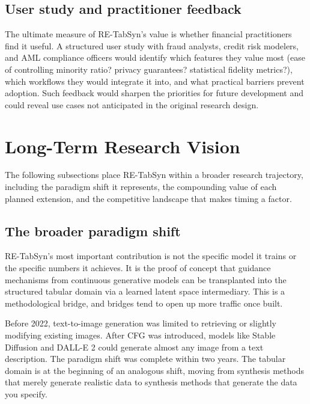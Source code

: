 \subsection{User study and practitioner feedback}

The ultimate measure of RE-TabSyn's value is whether financial practitioners find it useful. A structured user study with fraud analysts, credit risk modelers, and AML compliance officers would identify which features they value most (ease of controlling minority ratio? privacy guarantees? statistical fidelity metrics?), which workflows they would integrate it into, and what practical barriers prevent adoption. Such feedback would sharpen the priorities for future development and could reveal use cases not anticipated in the original research design.

\section{Long-Term Research Vision}

The following subsections place RE-TabSyn within a broader research trajectory, including the paradigm shift it represents, the compounding value of each planned extension, and the competitive landscape that makes timing a factor.

\subsection{The broader paradigm shift}

RE-TabSyn's most important contribution is not the specific model it trains or the specific numbers it achieves. It is the proof of concept that guidance mechanisms from continuous generative models can be transplanted into the structured tabular domain via a learned latent space intermediary. This is a methodological bridge, and bridges tend to open up more traffic once built.

Before 2022, text-to-image generation was limited to retrieving or slightly modifying existing images. After CFG was introduced, models like Stable Diffusion and DALL-E 2 could generate almost any image from a text description. The paradigm shift was complete within two years. The tabular domain is at the beginning of an analogous shift, moving from synthesis methods that merely generate realistic data to synthesis methods that generate the data you specify.

